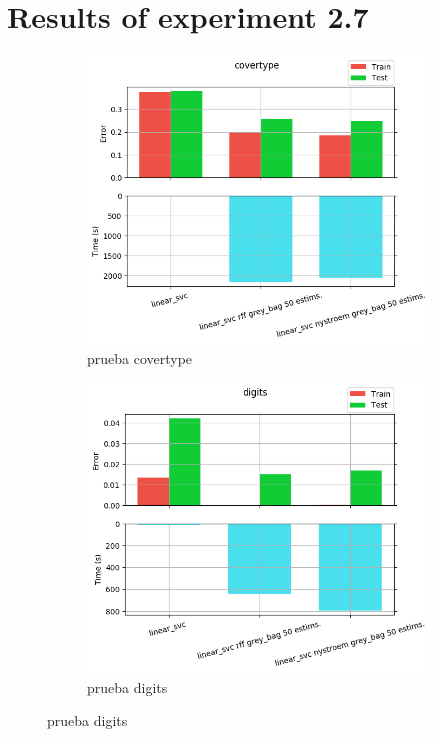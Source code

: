
\chapter{Results of experiment 2.7} %

\label{Appendix2-7} %

\begin{figure}[ht]
  \centering
  \begin{subfigure}[b]{0.5\linewidth}
    \centering\includegraphics[width=\imgscale\linewidth]{Figures/2_7/covertype}
    \caption{prueba covertype}
    \label{fig:2_7_covertype}
  \end{subfigure}%
  \begin{subfigure}[b]{0.5\linewidth}
    \centering\includegraphics[width=\imgscale\linewidth]{Figures/2_7/digits}
    \caption{prueba digits}
    \label{fig:2_7_digits}
  \end{subfigure}
\end{figure}


